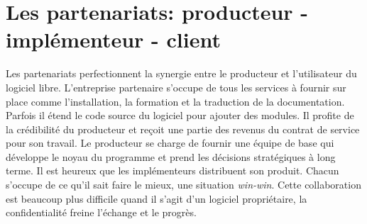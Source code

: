 \section*{Les partenariats: producteur - implémenteur - client} %
Les partenariats perfectionnent la synergie entre le producteur et l'utilisateur du logiciel
libre. L'entreprise partenaire s'occupe de tous les services à fournir sur place comme l'installation, la formation et
la traduction de la documentation. Parfois il étend le code source du logiciel pour ajouter des modules. 
Il profite de la crédibilité du producteur et reçoit une partie des revenus du contrat de service pour son travail.
Le producteur se charge de fournir une équipe de base qui développe le noyau du programme et 
prend les décisions stratégiques à long terme. Il est heureux que les implémenteurs
distribuent son produit. Chacun s'occupe de ce qu'il sait %
faire le mieux, une situation \textit{win-win}.
Cette collaboration est beaucoup plus difficile
quand il s'agit d'un logiciel propriétaire, la confidentialité freine l'échange et le progrès.

	
		
	